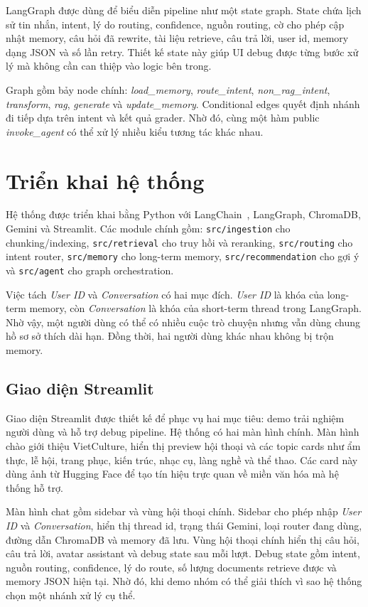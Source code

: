 \documentclass[11pt]{article}
\begin{document}
LangGraph được dùng để biểu diễn pipeline như một state graph. State chứa lịch sử tin nhắn, intent, lý do routing, confidence, nguồn routing, cờ cho phép cập nhật memory, câu hỏi đã rewrite, tài liệu retrieve, câu trả lời, user id, memory dạng JSON và số lần retry. Thiết kế state này giúp UI debug được từng bước xử lý mà không cần can thiệp vào logic bên trong.

Graph gồm bảy node chính: \textit{load\_memory}, \textit{route\_intent}, \textit{non\_rag\_intent}, \textit{transform}, \textit{rag}, \textit{generate} và \textit{update\_memory}. Conditional edges quyết định nhánh đi tiếp dựa trên intent và kết quả grader. Nhờ đó, cùng một hàm public \textit{invoke\_agent} có thể xử lý nhiều kiểu tương tác khác nhau.

\section{Triển khai hệ thống}

Hệ thống được triển khai bằng Python với LangChain~\citep{langchain}, LangGraph, ChromaDB, Gemini và Streamlit. Các module chính gồm: \texttt{src/ingestion} cho chunking/indexing, \texttt{src/retrieval} cho truy hồi và reranking, \texttt{src/routing} cho intent router, \texttt{src/memory} cho long-term memory, \texttt{src/recommendation} cho gợi ý và \texttt{src/agent} cho graph orchestration.

Việc tách \textit{User ID} và \textit{Conversation} có hai mục đích. \textit{User ID} là khóa của long-term memory, còn \textit{Conversation} là khóa của short-term thread trong LangGraph. Nhờ vậy, một người dùng có thể có nhiều cuộc trò chuyện nhưng vẫn dùng chung hồ sơ sở thích dài hạn. Đồng thời, hai người dùng khác nhau không bị trộn memory.

\subsection{Giao diện Streamlit}

Giao diện Streamlit được thiết kế để phục vụ hai mục tiêu: demo trải nghiệm người dùng và hỗ trợ debug pipeline. Hệ thống có hai màn hình chính. Màn hình chào giới thiệu VietCulture, hiển thị preview hội thoại và các topic cards như ẩm thực, lễ hội, trang phục, kiến trúc, nhạc cụ, làng nghề và thể thao. Các card này dùng ảnh từ Hugging Face để tạo tín hiệu trực quan về miền văn hóa mà hệ thống hỗ trợ.

Màn hình chat gồm sidebar và vùng hội thoại chính. Sidebar cho phép nhập \textit{User ID} và \textit{Conversation}, hiển thị thread id, trạng thái Gemini, loại router đang dùng, đường dẫn ChromaDB và memory đã lưu. Vùng hội thoại chính hiển thị câu hỏi, câu trả lời, avatar assistant và debug state sau mỗi lượt. Debug state gồm intent, nguồn routing, confidence, lý do route, số lượng documents retrieve được và memory JSON hiện tại. Nhờ đó, khi demo nhóm có thể giải thích vì sao hệ thống chọn một nhánh xử lý cụ thể.
\end{document}
